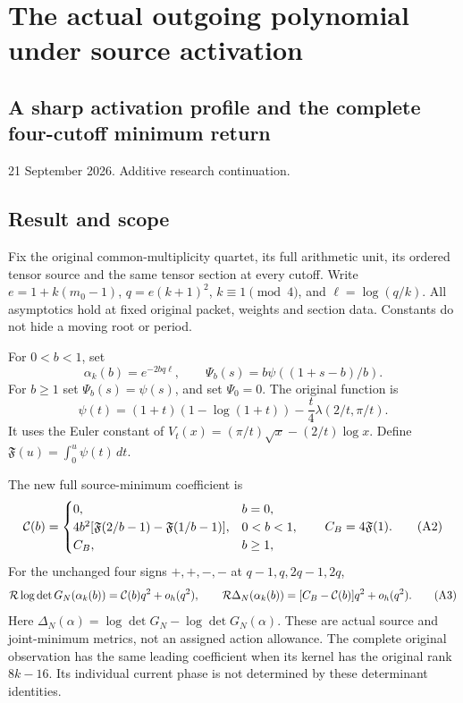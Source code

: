 \documentclass[11pt]{article}
\begin{document}
\section{The actual outgoing polynomial under source activation}\label{the-actual-outgoing-polynomial-under-source-activation}

\subsection{A sharp activation profile and the complete four-cutoff minimum return}\label{a-sharp-activation-profile-and-the-complete-four-cutoff-minimum-return}

21 September 2026. Additive research continuation.

\subsection{Result and scope}\label{result-and-scope}

Fix the original common-multiplicity quartet, its full arithmetic unit, its ordered tensor source and the same tensor section at every cutoff. Write \(e=1+k(m_0-1)\), \(q=e(k+1)^2\), \(k\equiv1\pmod4\), and \(\ell=\log(q/k)\). All asymptotics hold at fixed original packet, weights and section data. Constants do not hide a moving root or period.

For \(0<b<1\), set \[
 \alpha_k(b)=e^{-2bq\ell},\qquad
 \Psi_b(s)=b\psi((1+s-b)/b).
 \tag{A1}
\] For \(b\ge1\) set \(\Psi_b(s)=\psi(s)\), and set \(\Psi_0=0\). The original function is \[
 \psi(t)=(1+t)(1-\log(1+t))
       -\frac t4\lambda(2/t,\pi/t).
\] It uses the Euler constant of \(V_t(x)=(\pi/t)\sqrt{x}-(2/t)\log x\). Define \(\mathfrak F(u)=\int_0^u\psi(t)\,dt\).

The new full source-minimum coefficient is \[
 {\cal C}(b)=
 \begin{cases}
 0,&b=0,\\
 4b^2[\mathfrak F(2/b-1)-\mathfrak F(1/b-1)],&0<b<1,\\
 C_B,&b\ge1,
 \end{cases}
 \qquad C_B=4\mathfrak F(1).
 \tag{A2}
\] For the unchanged four signs \(+,+,-,-\) at \(q-1,q,2q-1,2q\), \[
 {\cal R}\log\det G_N(\alpha_k(b))
       ={\cal C}(b)q^2+o_h(q^2),
 \qquad
 {\cal R}\Delta_N(\alpha_k(b))
       =[C_B-{\cal C}(b)]q^2+o_h(q^2).
 \tag{A3}
\] Here \(\Delta_N(\alpha)=\log\det G_N-\log\det G_N(\alpha)\). These are actual source and joint-minimum metrics, not an assigned action allowance. The complete original observation has the same leading coefficient when its kernel has the original rank \(8k-16\). Its individual current phase is not determined by these determinant identities.
\end{document}
